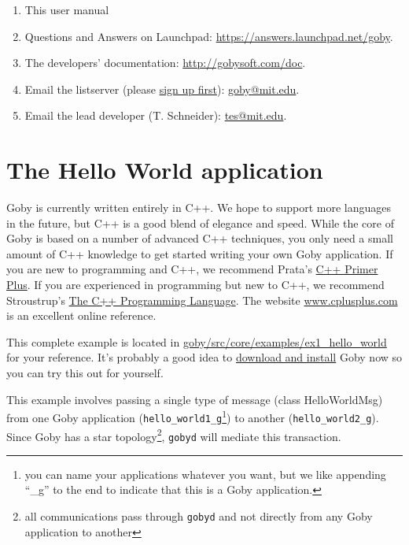 \documentclass[11pt, letterpaper]{article}
\begin{document}
\begin{enumerate}
\item This user manual
\item Questions and Answers on Launchpad: \url{https://answers.launchpad.net/goby}.
\item The developers' documentation: \url{http://gobysoft.com/doc}.
\item Email the listserver (please \href{http://mailman.mit.edu/mailman/listinfo/goby}{sign up first}): \href{mailto:goby@mit.edu}{goby@mit.edu}.
\item Email the lead developer (T. Schneider): \href{mailto:tes@mit.edu}{tes@mit.edu}.
\end{enumerate}

\section{The Hello World application}

Goby is currently written entirely in C++. We hope to support more languages in the future, but C++ is a good blend of elegance and speed. While the core of Goby is based on a number of advanced C++ techniques, you only need a small amount of C++ knowledge to get started writing your own Goby application. If you are new to programming and C++, we recommend Prata's \href{http://www.amazon.com/Primer-Plus-5th-Stephen-Prata/dp/0672326973}{C++ Primer Plus}. If you are experienced in programming but new to C++, we recommend Stroustrup's \href{http://www.amazon.com/C-Programming-Language-Special/dp/0201700735}{The C++ Programming Language}. The website \url{www.cplusplus.com} is an excellent online reference.

This complete example is located in \href{http://bazaar.launchpad.net/~goby-dev/goby/trunk/files/head:/src/core/examples/ex1_hello_world}{goby/src/core/examples/ex1\_hello\_world} for your reference. It's probably a good idea to \href{http://gobysoft.com/doc}{download and install} Goby now so you can try this out for yourself.

This example involves passing a single type of message (class HelloWorldMsg) from one Goby application (\texttt{hello\_world1\_g}\footnote{you can name your applications whatever you want, but we like appending ``\_g'' to the end to indicate that this is a Goby application.}) to another (\texttt{hello\_world2\_g}). Since Goby has a star topology\footnote{all communications pass through \texttt{gobyd} and not directly from any Goby application to another}, \texttt{gobyd} will mediate this transaction.
\end{document}

